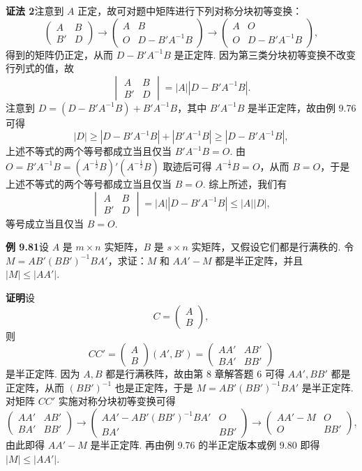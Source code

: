 \documentclass[UTF8,12pt,a4paper,fontset=fandol]{ctexart}
\begin{document}
\noindent\textbf{证法 2}\quad 注意到 $A$ 正定，故可对题中矩阵进行下列对称分块初等变换：
\[
\begin{pmatrix}
A&B\\
B'&D
\end{pmatrix}
\longrightarrow
\begin{pmatrix}
A&B\\
O&D-B'A^{-1}B
\end{pmatrix}
\longrightarrow
\begin{pmatrix}
A&O\\
O&D-B'A^{-1}B
\end{pmatrix},
\]
得到的矩阵仍正定，从而 $D-B'A^{-1}B$ 是正定阵. 因为第三类分块初等变换不改变行列式的值，故
\[
\begin{vmatrix}
A&B\\
B'&D
\end{vmatrix}
=|A||D-B'A^{-1}B|.
\]
注意到 $D=(D-B'A^{-1}B)+B'A^{-1}B$，其中 $B'A^{-1}B$ 是半正定阵，故由例 9.76 可得
\[
|D|\ge |D-B'A^{-1}B|+|B'A^{-1}B|\ge |D-B'A^{-1}B|,
\]
上述不等式的两个等号都成立当且仅当 $B'A^{-1}B=O$. 由 $O=B'A^{-1}B=(A^{-\frac12}B)'(A^{-\frac12}B)$ 取迹后可得 $A^{-\frac12}B=O$，从而 $B=O$，于是上述不等式的两个等号都成立当且仅当 $B=O$. 综上所述，我们有
\[
\begin{vmatrix}
A&B\\
B'&D
\end{vmatrix}
=|A||D-B'A^{-1}B|\le |A||D|,
\]
等号成立当且仅当 $B=O$.

\noindent\textbf{例 9.81}\quad 设 $A$ 是 $m\times n$ 实矩阵，$B$ 是 $s\times n$ 实矩阵，又假设它们都是行满秩的. 令 $M=AB'(BB')^{-1}BA'$，求证：$M$ 和 $AA'-M$ 都是半正定阵，并且 $|M|\le |AA'|$.

\noindent\textbf{证明}\quad 设
\[
C=\begin{pmatrix}A\\B\end{pmatrix},
\]
则
\[
CC'=\begin{pmatrix}A\\B\end{pmatrix}(A',B')
=\begin{pmatrix}
AA'&AB'\\
BA'&BB'
\end{pmatrix}
\]
是半正定阵. 因为 $A,B$ 都是行满秩阵，故由第 8 章解答题 6 可得 $AA',BB'$ 都是正定阵，从而 $(BB')^{-1}$ 也是正定阵，于是 $M=AB'(BB')^{-1}BA'$ 是半正定阵. 对矩阵 $CC'$ 实施对称分块初等变换可得
\[
\begin{pmatrix}
AA'&AB'\\
BA'&BB'
\end{pmatrix}
\longrightarrow
\begin{pmatrix}
AA'-AB'(BB')^{-1}BA'&O\\
BA'&BB'
\end{pmatrix}
\longrightarrow
\begin{pmatrix}
AA'-M&O\\
O&BB'
\end{pmatrix},
\]
由此即得 $AA'-M$ 是半正定阵. 再由例 9.76 的半正定版本或例 9.80 即得 $|M|\le |AA'|$.
\end{document}
